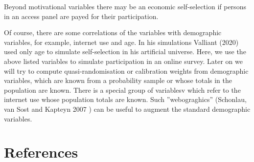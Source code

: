 \documentclass[a4paper , 11pt]{article}
\begin{document}
\noindent Beyond motivational variables there may be an economic self-selection if persons in an access panel are payed for their participation.

Of course, there are some correlations of the variables  with demographic variables, for example, internet use and age. In his simulations Valliant (2020) used only age to simulate self-selection in his artificial universe. Here, we use the above listed variables to simulate participation in an online survey. Later on we will try to compute quasi-randomisation or calibration weights from demographic variables, which are known from a probability sample or whose totals in the population are known. There is a special group of variablesv which refer to the internet use whose population totals are known. Such ''webograghics'' (Schonlau, van Sost and Kapteyn 2007 ) can be useful to augment the standard demographic variables.


\section*{References}
\end{document}
